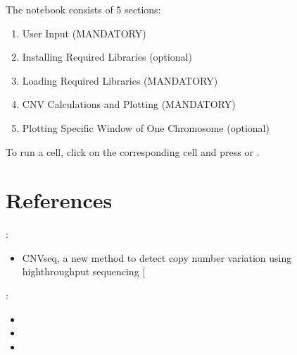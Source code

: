 \documentclass[letterpaper,10pt,english]{sphinxhowto}
\begin{document}
The notebook consists of 5 sections:
\begin{enumerate}
%
\item {} 
User Input (MANDATORY)

\item {} 
Installing Required Libraries (optional)

\item {} 
Loading Required Libraries (MANDATORY)

\item {} 
CNV Calculations and Plotting (MANDATORY)

\item {} 
Plotting Specific Window of One Chromosome (optional)

\end{enumerate}

To run a cell, click on the corresponding cell and press  or .


\section{References}
\label{\detokenize{index:references}}
:
\begin{itemize}
\item {} 
CNV\sphinxhyphen{}seq, a new method to detect copy number variation using high\sphinxhyphen{}throughput sequencing {[}\sphinxhref{https://bmcbioinformatics.biomedcentral.com/articles/10.1186/1471-2105-10-80}{LINK}{]}

\end{itemize}

:
\begin{itemize}
\item {} 

\item {} 

\item {} 

\end{itemize}



\renewcommand{\indexname}{Index}
\printindex
\end{document}
